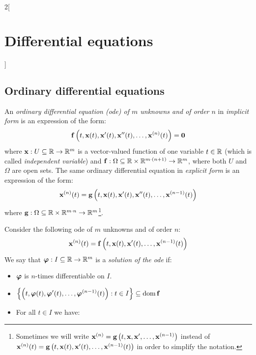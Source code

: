 \documentclass[../../../main.tex]{subfiles}
\begin{document}
\begin{multicols}{2}[\section{Differential equations}]
  \subsection{Ordinary differential equations}
  \begin{definition}
    An \textit{ordinary differential equation (ode) of $m$ unknowns and of order $n$} in \textit{implicit form} is an expression of the form: $$\boldsymbol{\mathrm{f}}\left(t,\boldsymbol{\mathrm{x}}(t),\boldsymbol{\mathrm{x}}'(t),\boldsymbol{\mathrm{x}}''(t),\ldots,\boldsymbol{\mathrm{x}}^{(n)}(t)\right)=\boldsymbol{\mathrm{0}}$$
    where $\boldsymbol{\mathrm{x}}:U\subseteq\mathbb{R}\rightarrow\mathbb{R}^m$ is a vector-valued function of one variable $t\in\mathbb{R}$ (which is called \textit{independent variable}) and $\boldsymbol{\mathrm{f}}:\Omega\subseteq\mathbb{R}\times\mathbb{R}^{m\cdot(n+1)}\rightarrow\mathbb{R}^m$, where both $U$ and $\Omega$ are open sets. The same ordinary differential equation in \textit{explicit form} is an expression of the form: $$\boldsymbol{\mathrm{x}}^{(n)}(t)=\boldsymbol{\mathrm{g}}\left(t,\boldsymbol{\mathrm{x}}(t),\boldsymbol{\mathrm{x}}'(t),\boldsymbol{\mathrm{x}}''(t),\ldots,\boldsymbol{\mathrm{x}}^{(n-1)}(t)\right)$$
    where $\boldsymbol{\mathrm{g}}:\Omega\subseteq\mathbb{R}\times\mathbb{R}^{m\cdot n}\rightarrow\mathbb{R}^m$\footnote{Sometimes we will write $\boldsymbol{\mathrm{x}}^{(n)}=\boldsymbol{\mathrm{g}}\left(t,\boldsymbol{\mathrm{x}},\boldsymbol{\mathrm{x}}',\ldots,\boldsymbol{\mathrm{x}}^{(n-1)}\right)$ instead of $\boldsymbol{\mathrm{x}}^{(n)}(t)=\boldsymbol{\mathrm{g}}\left(t,\boldsymbol{\mathrm{x}}(t),\boldsymbol{\mathrm{x}}'(t),\ldots,\boldsymbol{\mathrm{x}}^{(n-1)}(t)\right)$ in order to simplify the notation.}.
  \end{definition}
  \begin{definition}
    Consider the following ode of $m$ unknowns and of order $n$:
    \begin{equation}\label{DE_ode1}
      \boldsymbol{\mathrm{x}}^{(n)}(t)=\boldsymbol{\mathrm{f}}\left(t,\boldsymbol{\mathrm{x}}(t),\boldsymbol{\mathrm{x}}'(t),\ldots,\boldsymbol{\mathrm{x}}^{(n-1)}(t)\right)
    \end{equation}
    We say that $\boldsymbol{\mathrm{\varphi}}:I\subseteq\mathbb{R}\rightarrow\mathbb{R}^m$ is a \textit{solution of the ode} if:
    \begin{itemize}
      \item $\boldsymbol{\mathrm{\varphi}}$ is $n$-times differentiable on $I$.
      \item $\displaystyle\left\{\left(t,\boldsymbol{\mathrm{\varphi}}(t),\boldsymbol{\mathrm{\varphi}}'(t),\ldots,\boldsymbol{\mathrm{\varphi}}^{(n-1)}(t)\right):t\in I\right\}\subseteq\operatorname{dom} \boldsymbol{\mathrm{f}}$
      \item For all $t\in I$ we have:

\end{itemize}
\end{definition}
\end{multicols}
\end{document}
